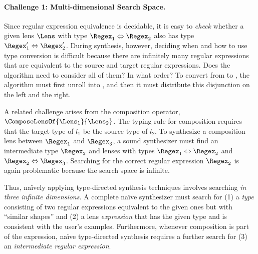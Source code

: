 \documentclass[sigplan,acmsmall]{acmart}
\begin{document}
\paragraph*{Challenge 1: Multi-dimensional Search Space.}
Since regular expression equivalence is decidable, 
it is easy to \emph{check} whether a given lens $\Lens$ with type 
$\Regex_1 \Leftrightarrow \Regex_2$
also has type 
$\Regex_1' \Leftrightarrow \Regex_2'$. 
%
During synthesis, however, deciding when and how to use type conversion is
difficult because there are infinitely many regular expressions that are
equivalent to the source and target regular expressions.  Does the algorithm
need to consider all of them?  In what order?  To convert from
 to ,
the algorithm must first unroll  into
, and then it must
distribute this disjunction on the left and the right.

A related challenge arises from the composition operator,
$\ComposeLensOf{\Lens_1}{\Lens_2}$.  The typing rule for composition
requires that the target type of $l_1$ be the source
type of $l_2$.  To synthesize a composition lens between
$\Regex_1$ and $\Regex_3$, a sound synthesizer must find an intermediate type
$\Regex_2$ and lenses with types $\Regex_1 \Leftrightarrow \Regex_2$ and
$\Regex_2 \Leftrightarrow \Regex_3$.  Searching for the correct
regular expression $\Regex_2$ is again problematic because
the search space is infinite.   



Thus, na\"{i}vely applying type-directed synthesis techniques
involves searching \emph{in three infinite dimensions}.  A complete na\"{i}ve
synthesizer must search for
(1) a \emph{type} consisting of two regular expressions equivalent to the
given ones but with ``similar shapes'' and
(2) a lens \emph{expression} that has the given type and is consistent
with the user's examples.
Furthermore, whenever composition is part of the
expression, na\"{i}ve type-directed synthesis requires a further search for
(3) an {\em intermediate regular expression}.
\end{document}
